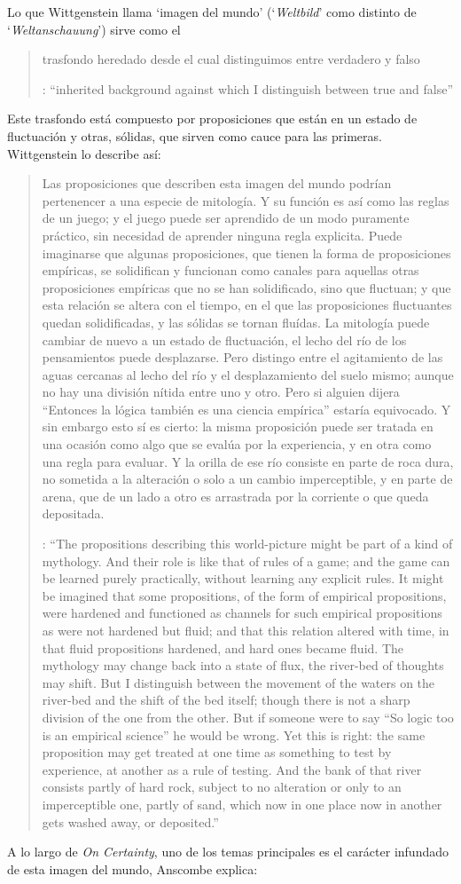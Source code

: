 Lo que Wittgenstein llama `imagen del mundo' (`\emph{Weltbild}' como distinto de `\emph{Weltanschauung}') sirve como el \blockquote[{\cite[\S94]{wittgenstein1969oncert}}: \enquote{inherited background against which I distinguish between true and false}]{trasfondo heredado desde el cual distinguimos entre verdadero y falso}. Este trasfondo está compuesto por proposiciones que están en un estado de fluctuación y otras, sólidas, que sirven como cauce para las primeras. Wittgenstein lo describe así: \blockquote[{\cite[\S95--99]{wittgenstein1969oncert}}: \enquote{The propositions describing this world-picture might be part of a kind of mythology. And their role is like that of rules of a game; and the game can be learned purely practically, without learning any explicit rules. It might be imagined that some propositions, of the form of empirical propositions, were hardened and functioned as channels for such empirical propositions as were not hardened but fluid; and that this relation altered with time, in that fluid propositions hardened, and hard ones became fluid. The mythology may change back into a state of flux, the river-bed of thoughts may shift. But I distinguish between the movement of the waters on the river-bed and the shift of the bed itself; though there is not a sharp division of the one from the other. But if someone were to say ``So logic too is an empirical science'' he would be wrong. Yet this is right: the same proposition may get treated at one time as something to test by experience, at another as a rule of testing. And the bank of that river consists partly of hard rock, subject to no alteration or only to an imperceptible one, partly of sand, which now in one place now in another gets washed away, or deposited.}]{Las proposiciones que describen esta imagen del mundo podrían pertenencer a una especie de mitología. Y su función es así como las reglas de un juego; y el juego puede ser aprendido de un modo puramente práctico, sin necesidad de aprender ninguna regla explicita. Puede imaginarse que algunas proposiciones, que tienen la forma de proposiciones empíricas, se solidifican y funcionan como canales para aquellas otras proposiciones empíricas que no se han solidificado, sino que fluctuan; y que esta relación se altera con el tiempo, en el que las proposiciones fluctuantes quedan solidificadas, y las sólidas se tornan fluídas. La mitología puede cambiar de nuevo a un estado de fluctuación, el lecho del río de los pensamientos puede desplazarse. Pero distingo entre el agitamiento de las aguas cercanas al lecho del río y el desplazamiento del suelo mismo; aunque no hay una división nítida entre uno y otro. Pero si alguien dijera ``Entonces la lógica también es una ciencia empírica'' estaría equivocado. Y sin embargo esto sí es cierto: la misma proposición puede ser tratada en una ocasión como algo que se evalúa por la experiencia, y en otra como una regla para evaluar. Y la orilla de ese río consiste en parte de roca dura, no sometida a la alteración o solo a un cambio imperceptible, y en parte de arena, que de un lado a otro es arrastrada por la corriente o que queda depositada.} A lo largo de \emph{On Certainty}, uno de los temas principales es el carácter infundado de esta imagen del mundo, Anscombe explica: 